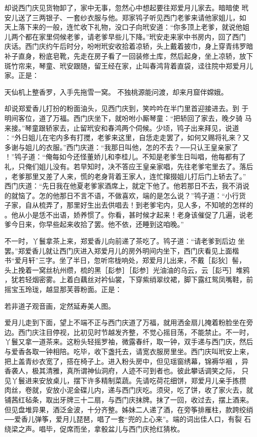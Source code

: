 却说西门庆见货物卸了，家中无事，忽然心中想起要往郑爱月儿家去。暗暗使
玳安儿送了三两银子、一套纱衣服与他。郑家鸨子听见西门老爹来请他家姐儿，如
天上落下来的一般，连忙收下礼物，没口子向玳安道：“你多顶上老爹，就说他姐
儿两个都在家里伺候老爹，请老爹早些儿下降。”玳安走来家中书房内，回了西门
庆话。西门庆约午后时分，吩咐玳安收拾着凉轿，头上戴着披巾，身上穿青纬罗暗
补子直身，粉底皂靴，先走在房子看了一回装修土库，然后起身，坐上凉轿，放下
斑竹帘来，琴童、玳安跟随，留王经在家，止叫春鸿背着直袋，迳往院中郑爱月儿
家。正是：

天仙机上整香罗，入手先拖雪一窝。
不独桃源能问渡，却来月窟伴嫦娥。

却说郑爱香儿打扮的粉面油头，见西门庆到，笑吟吟在半门里首迎接进去。到
于明间客位，道了万福。西门庆坐下，就吩咐小厮琴童：“把轿回了家去，晚夕骑
马来接。”琴童跟轿家去，止留玳安和春鸿两个伺候。少顷，鸨子出来拜见，说道
：“外日姐儿在宅内多有打搅，老爹来这里，自恁走走罢了，如何又赐将礼来？又
多谢与姐儿的衣服。”西门庆道：“我那日叫他，怎的不去？──只认王皇亲家了
！”鸨子道：“俺每如今还怪董娇儿和李桂儿。不知是老爹生日叫唱，他每都有了
礼，只俺们姐儿没有。若早知时，决不答应王皇亲家唱，先往老爹宅里去了。落后
，老爹那里又差了人来，慌的老身背着王家人，连忙撺掇姐儿打后门上轿去了。”
西门庆道：“先日我在他夏老爹家酒席上，就定下他了。他若那日不去，我不消说
的就恼了。怎的他那日不言不语，不做喜欢，端的是怎么说？”鸨子道：“小行货
子家，自从梳弄了，那里好生出去供唱去！到老爹宅内，见人多，不知唬的怎样的
。他从小是恁不出语，娇养惯了。你看，甚时候才起来！老身该催促了几遍，说老
爹今日来，你早些起来收拾了罢。他不依，还睡到这咱晚。”

不一时，丫鬟拿茶上来，郑爱香儿向前递了茶吃了。鸨子道：“请老爹到后边
坐罢。”郑爱香儿就让西门庆进入郑爱月儿的房外明间内坐下，西门庆看见上面楷
书“爱月轩”三字。坐了半日，忽听帘栊响处，郑爱月儿出来，不戴［髟狄］髻，
头上挽着一窝丝杭州缵，梳的黑［髟参］［髟参］光油油的乌云，云［髟丐］堆鸦
，犹若轻烟密雾。上着白藕丝对衿仙裳，下穿紫绡翠纹裙，脚下露红鸳凤嘴鞋，前
摇宝玉玲珑，越显那芙蓉粉面。正是：

若非道子观音画，定然延寿美人图。

爱月儿走到下面，望上不端不正与西门庆道了万福，就用洒金扇儿掩着粉脸坐在旁
边。西门庆注目停视，比初见时节越发齐整，不觉心摇目荡，不能禁止。不一时，
丫鬟又拿一道茶来。这粉头轻摇罗袖，微露春纤，取一钟，双手递与西门庆，然后
与爱香各取一钟相陪。吃毕，收下盏托去，请宽衣服房里坐。西门庆叫玳安上来，
把上盖青纱衣宽了，搭在椅子上。进入粉头房中，但见瑶窗绣幕，锦褥华裀
，异香袭人，极其清雅，真所谓神仙洞府，人迹不可到者也。彼此攀话调笑之际，
只见丫鬟进来安放桌儿，摆下许多精制菜蔬。先请吃荷花细饼，郑爱月儿亲手拣攒
肉丝，卷就，安放小泥金碟儿内，递与西门庆吃。须臾，吃了饼，收了家火去，就
铺茜红毡条，取出牙牌三十二扇，与西门庆抹牌。抹了一回，收过去，摆上酒来。
但见盘堆异果，酒泛金波，十分齐整。姊妹二人递了酒，在旁筝排雁柱，款跨绞绡
──爱香儿弹筝，爱月儿琵琶，唱了一套“兜的上心来”。端的词出佳人口，有裂
石绕梁之声。唱毕，促席而坐，拿骰盆儿与西门庆抢红猜枚。

